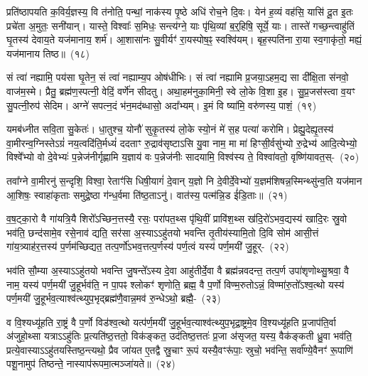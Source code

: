 प्रति॑\-ष्ठापयति क॒विर्य॒ज्ञस्य॒ वि त॑नोति॒ पन्थां॒ नाक॑स्य पृ॒ष्ठे अधि॑ रोच॒ने दि॒वः। येन॑ ह॒व्यं वह॑सि॒ यासि॑ दू॒त इ॒तः प्रचे॑ता अ॒मुतः॒ सनी॑यान्। यास्ते॒ विश्वाः᳚ स॒मिधः॒ सन्त्य॑ग्ने॒ याः पृ॑थि॒व्यां ब॒र्॒\mbox{}हिषि॒ सूर्ये॒ याः। तास्ते॑ गच्छ॒न्त्वाहु॑तिं घृ॒तस्य॑ देवाय॒ते यज॑मानाय॒ शर्म॑। आ॒शासा॑नः सु॒वीर्यꣳ॑ रा॒यस्पोष॒ꣴ॒ स्वश्वि॑यम्। बृह॒स्पति॑ना रा॒या स्व॒गाकृ॑तो॒ मह्यं॒ यज॑मानाय तिष्ठ॥~(१८)

{\anuvakamend[{स॒मा॒नाना॒मोष॑धीष्वे॒व प॒शून्मह्यं॒ यज॑माना॒यैक॑ञ्च}]}%

सं त्वा॑ नह्यामि॒ पय॑सा घृ॒तेन॒ सं त्वा॑ नह्याम्य॒प ओष॑धीभिः। सं त्वा॑ नह्यामि प्र॒जया॒\-ऽहम॒द्य सा दी᳚क्षि॒ता स॑नवो॒ वाज॑म॒स्मे। प्रैतु॒ ब्रह्म॑ण॒स्पत्नी॒ वेदिं॒ वर्णे॑न सीदतु। अथा॒हम॑नुका॒मिनी॒ स्वे लो॒के वि॒शा इ॒ह। सु॒प्र॒जस॑स्त्वा व॒यꣳ सु॒पत्नी॒रुप॑ सेदिम। अग्ने॑ सपत्न॒दं भ॑न॒मद॑ब्धासो॒ अदा᳚भ्यम्। इ॒मं वि ष्या॑मि॒ वरु॑णस्य॒ पाशं॒~(१९)

यमब॑ध्नीत सवि॒ता सु॒केतः॑। धा॒तुश्च॒ योनौ॑ सुकृ॒तस्य॑ लो॒के स्यो॒नं मे॑ स॒ह पत्या॑ करोमि। प्रेह्यु॒देह्यृ॒तस्य॑ वा॒मीरन्व॒ग्निस्ते\-ऽग्रं॑ नय॒त्वदि॑ति॒र्मध्यं॑ ददताꣳ रु॒द्राव॑सृष्टाऽसि यु॒वा नाम॒ मा मा॑ हिꣳसी॒र्वसु॑भ्यो रु॒द्रेभ्य॑ आदि॒त्येभ्यो॒ विश्वे᳚भ्यो वो दे॒वेभ्यः॑ प॒न्ने\-ज॑नीर्गृह्णामि य॒ज्ञाय॑ वः प॒न्ने\-ज॑नीः सादयामि॒ विश्व॑स्य ते॒ विश्वा॑वतो॒ वृष्णि॑यावत॒स्-~(२०)

तवा᳚ग्ने वा॒मीरनु॑ स॒न्दृशि॒ विश्वा॒ रेताꣳ॑सि धिषी॒यागं॑ दे॒वान् य॒ज्ञो नि दे॒वीर्दे॒वेभ्यो॑ य॒ज्ञम॑शिषन्न॒स्मिन्थ्सु॑न्व॒ति यज॑मान आ॒शिषः॒ स्वाहा॑कृताः समुद्रे॒ष्ठा ग॑न्ध॒र्वमा ति॑ष्ठ॒ता\-ऽनु॑। वात॑स्य॒ पत्म॑न्नि॒ड ई॑डि॒ताः॥~(२१)

{\anuvakamend[{पाशं॒ वृष्णि॑यावतस्त्रि॒ꣳ॒शच्च॑}]}%

व॒ष॒ट्का॒रो वै गा॑यत्रि॒यै शिरो᳚\-ऽच्छिन॒त्तस्यै॒ रसः॒ परा॑पत॒थ्स पृ॑थि॒वीं प्रावि॑श॒थ्स ख॑दि॒रो॑\-ऽभव॒द्यस्य॑ खादि॒रः स्रु॒वो भव॑ति॒ छन्द॑सामे॒व रसे॒नाव॑ द्यति॒ सर॑सा अ॒स्या\-ऽऽ\-हु॑तयो भवन्ति तृ॒तीय॑स्यामि॒तो दि॒वि सोम॑ आसी॒त्तं गा॑य॒त्र्याह॑र॒त्तस्य॑ प॒र्णम॑च्छिद्यत॒ तत्प॒र्णो॑\-ऽभव॒त्तत्प॒र्णस्य॑ पर्ण॒त्वं यस्य॑ पर्ण॒मयी॑ जु॒हूर्-~(२२)

भव॑ति सौ॒म्या अ॒स्या\-ऽऽ\-हु॑तयो भवन्ति जु॒षन्ते᳚\-ऽस्य दे॒वा आहु॑तीर्दे॒वा वै ब्रह्म॑न्नवदन्त॒ तत्प॒र्ण उपा॑शृणोथ्सु॒श्रवा॒ वै नाम॒ यस्य॑ पर्ण॒मयी॑ जु॒हूर्भव॑ति॒ न पा॒पꣴ श्लोकꣳ॑ शृणोति॒ ब्रह्म॒ वै प॒र्णो विण्म॒रुतो\-ऽन्नं॒ विण्मा॑रु॒तो᳚\-ऽश्व॒त्थो यस्य॑ पर्ण॒मयी॑ जु॒हूर्भव॒त्याश्व॑त्थ्युप॒भृद्ब्रह्म॑णै॒वान्न॒मव॑ रु॒न्धे\-ऽथो॒ ब्रह्मै॒-~(२३)

व वि॒श्यध्यू॑हति रा॒ष्ट्रं वै प॒र्णो विड॑श्व॒त्थो यत्प॑र्ण॒मयी॑ जु॒हूर्भव॒त्याश्व॑त्थ्युप॒भृद्रा॒ष्ट्रमे॒व वि॒श्यध्यू॑हति प्र॒जा\-प॑ति॒र्वा अ॑जुहो॒थ्सा यत्रा\-ऽऽ\-हु॑तिः प्र॒त्यति॑ष्ठ॒त्ततो॒ विक॑ङ्कत॒ उद॑तिष्ठ॒त्ततः॑ प्र॒जा अ॑सृजत॒ यस्य॒ वैक॑ङ्कती ध्रु॒वा भव॑ति॒ प्रत्ये॒वास्या\-ऽऽ\-हु॑तयस्तिष्ठ॒न्त्यथो॒ प्रैव जा॑यत ए॒तद्वै स्रु॒चाꣳ रू॒पं यस्यै॒वꣳरू॑पाः॒ स्रुचो॒ भव॑न्ति॒ सर्वा᳚ण्ये॒वैनꣳ॑ रू॒पाणि॑ पशू॒नामुप॑ तिष्ठन्ते॒ नास्याप॑रूपमा॒त्मञ्जा॑यते॥~(२४)

